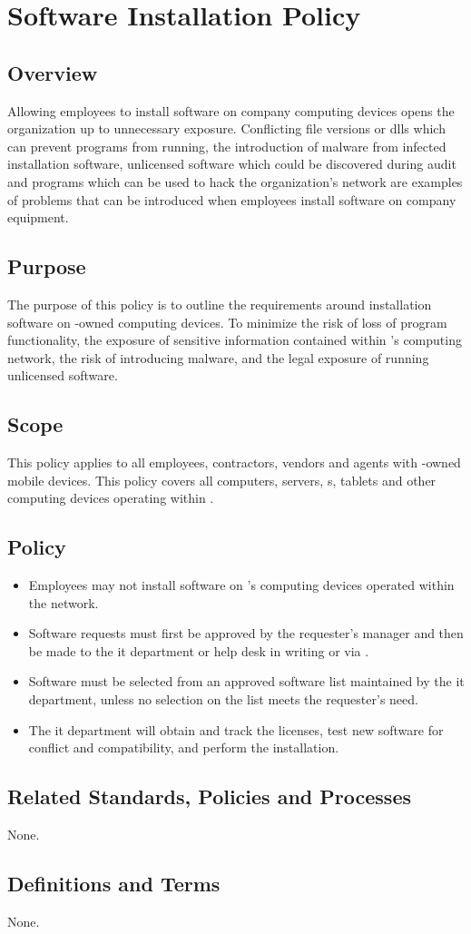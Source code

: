 \chapter{Software Installation Policy}
\section{Overview}
Allowing employees to install software on company computing devices opens the organization up to unnecessary exposure.  
Conflicting file versions or \glspl{dll} which can prevent programs from running, the introduction of malware from infected installation software, unlicensed software which could be discovered during audit\oxford{} and programs which can be used to hack the organization's network are examples of problems that can be introduced when employees install software on company equipment.
\section{Purpose}
The purpose of this policy is to outline the requirements around installation software on \CompanyName{}-owned computing devices.  
To minimize the risk of loss of program functionality, the exposure of sensitive information contained within \CompanyName{}'s computing network, the risk of introducing malware, and the legal exposure of running unlicensed software.
\section{Scope}
This policy applies to all \CompanyName{} employees, contractors, vendors\oxford{} and agents with \CompanyName{}-owned mobile devices.  
This policy covers all computers, servers, \smartphone{}s, tablets\oxford{} and other computing devices operating within \CompanyName{}.
\section{Policy}
\begin{itemize}
\item
Employees may not install software on \CompanyName{}'s computing devices operated within the \CompanyName{} network.  
\item
Software requests must first be approved by the requester's manager and then be made to the \gls{it} department or help desk in writing or via \email.  
\item
Software must be selected from an approved software list maintained by the \gls{it} department, unless no selection on the list meets the requester's need.  
\item
The \gls{it} department will obtain and track the licenses, test new software for conflict and compatibility, and perform the installation.
\end{itemize}
\CommonPolicyCompliance
\section{Related Standards, Policies\oxford{} and Processes}
None.
\section{Definitions and Terms}
None.
\CommonRevisionHistory

